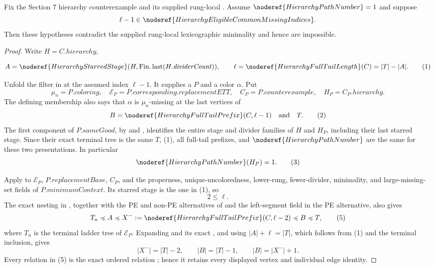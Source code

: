 \begin{lemma}
Fix the Section 7 hierarchy counterexample and its supplied rung-local
.  Assume
\(\noderef{HierarchyPathNumber}=1\) and suppose
\[
 \ell-1\in\noderef{HierarchyEligibleCommonMissingIndices}.
\]
Then these hypotheses contradict the supplied rung-local lexicographic
minimality and hence are impossible.
\end{lemma}
\begin{proof}
Write \(H=C.\mathit{hierarchy}\),

\[
 A=\noderef{HierarchyStarredStage}
       (H,\operatorname{Fin.last}(H.\mathit{dividerCount})),
 \qquad
 \ell=\noderef{HierarchyFullTailLength}(C)=|T|-|A|.
                                                               \tag{1}
\]

Unfold the filter in
 at the assumed index
\(\ell-1\).  It supplies a
 \(P\) and a color \(\alpha\).
Put
\[
 \mu_n=P.\mathit{coloring},\quad
 \mathcal E_P=P.\mathit{corresponding}.\mathit{replacementETT},\quad
 C_P=P.\mathit{counterexample},\quad
 H_P=C_P.\mathit{hierarchy}.
\]
The defining membership also says that \(\alpha\) is \(\mu_n\)-missing at
the last vertices of
\[
 B=\noderef{HierarchyFullTailPrefix}(C,\ell-1)
 \quad\hbox{and}\quad T.                                     \tag{2}
\]
The first component of \(P.\mathit{sameGood}\), by
 and
, identifies the entire stage and divider
families of \(H\) and \(H_P\), including their last starred stage.  Since
their exact terminal tree is the same \(T\), (1), all full-tail prefixes,
and \(\noderef{HierarchyPathNumber}\) are the same for these two
presentations.  In particular
\[
                 \noderef{HierarchyPathNumber}(H_P)=1.        \tag{3}
\]

Apply  to
\(\mathcal E_P\), \(P.\mathit{replacementBase}\), \(C_P\), and the
properness, unique-uncoloredness, lower-rung, fewer-divider, minimality, and
large-missing-set fields of \(P.\mathit{minimumContext}\).  Its starred
stage is the one in (1), so
\[
                              2\leq\ell.                       \tag{4}
\]
The exact nesting in , together with the PE
and non-PE alternatives of  and the
 left-segment field in the PE alternative, also
gives
\[
 T_n\preccurlyeq A\preccurlyeq
 X^-:=\noderef{HierarchyFullTailPrefix}(C,\ell-2)
 \preccurlyeq B\preccurlyeq T,                               \tag{5}
\]
where \(T_n\) is the terminal ladder tree of \(\mathcal E_P\).  Expanding
 and its exact
, and using
\(|A|+\ell=|T|\), which follows from (1) and the terminal inclusion, gives
\[
 |X^-|=|T|-2,\qquad |B|=|T|-1,\qquad |B|=|X^-|+1.             \tag{6}
\]
Every relation in (5) is the exact ordered relation
; hence it retains every displayed
vertex and individual edge identity.


\end{proof}
